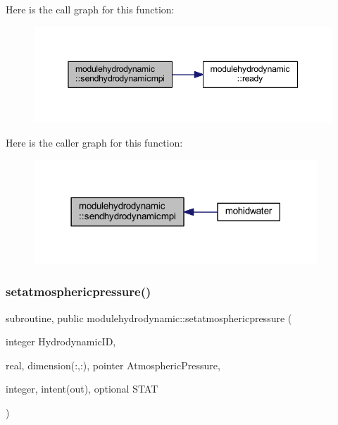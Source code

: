 Here is the call graph for this function\+:\nopagebreak
\begin{figure}[H]
\begin{center}
\leavevmode
\includegraphics[width=345pt]{namespacemodulehydrodynamic_a81c72f539c0330e132af0d9586b8a1b4_cgraph}
\end{center}
\end{figure}
Here is the caller graph for this function\+:\nopagebreak
\begin{figure}[H]
\begin{center}
\leavevmode
\includegraphics[width=302pt]{namespacemodulehydrodynamic_a81c72f539c0330e132af0d9586b8a1b4_icgraph}
\end{center}
\end{figure}
\mbox{\label{namespacemodulehydrodynamic_ab767a1bf58d41f86c6b2ab58684d962d}} 
\subsubsection{\texorpdfstring{setatmosphericpressure()}{setatmosphericpressure()}}
{\footnotesize\ttfamily subroutine, public modulehydrodynamic\+::setatmosphericpressure (\begin{DoxyParamCaption}\item[{integer}]{Hydrodynamic\+ID,  }\item[{real, dimension(\+:,\+:), pointer}]{Atmospheric\+Pressure,  }\item[{integer, intent(out), optional}]{S\+T\+AT }\end{DoxyParamCaption})}

